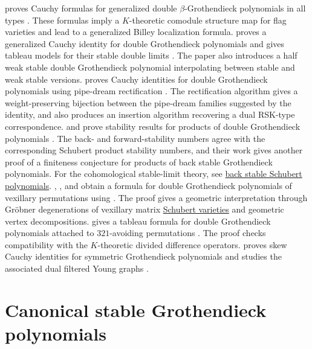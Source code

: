  proves Cauchy formulas for generalized double
$\beta$-Grothendieck polynomials in all types \cite{Xiong2021Grothendieck}.
These formulas imply a $K$-theoretic comodule structure map for flag
varieties and lead to a generalized Billey localization formula.
 proves a generalized Cauchy identity for double
Grothendieck polynomials and gives tableau models for their stable double
limits \cite{Hawkes2024}.  The paper also introduces a half weak stable double
Grothendieck polynomial interpolating between stable and weak stable versions.
 proves Cauchy identities for double Grothendieck
polynomials using pipe-dream rectification
\cite{Dennin2025Grothendieckx}.  The rectification algorithm gives a
weight-preserving bijection between the pipe-dream families suggested by the
identity, and also produces an insertion algorithm recovering a dual
RSK-type correspondence.
 and  prove stability results for
products of double Grothendieck polynomials \cite{HardtWallach2025x}.  The
back- and forward-stability numbers agree with the corresponding Schubert
product stability numbers, and their work gives another proof of a finiteness
conjecture for products of back stable Grothendieck polynomials.
For the cohomological stable-limit theory, see
\hyperref[backStableSchubert]{back stable Schubert polynomials}.
, , and  obtain a
formula for double Grothendieck polynomials of vexillary permutations using
\label{flaggedSetValuedTableau}
\cite{KnutsonMillerYong2009}.  The proof gives
a geometric interpretation through Gröbner degenerations of vexillary matrix
\hyperref[schubertVarietiesAndMatroids]{Schubert varieties} and geometric
vertex decompositions.
 gives a tableau formula for double Grothendieck
polynomials attached to $321$-avoiding permutations \cite{Matsumura2020}.
The proof checks compatibility with the $K$-theoretic divided difference
operators.
 proves skew Cauchy identities for symmetric
Grothendieck polynomials and studies the associated dual filtered Young
graphs \cite{Yeliussizov2019SkewGrothendieck}.



\section[grothendieckCanonical]{Canonical stable Grothendieck polynomials}

